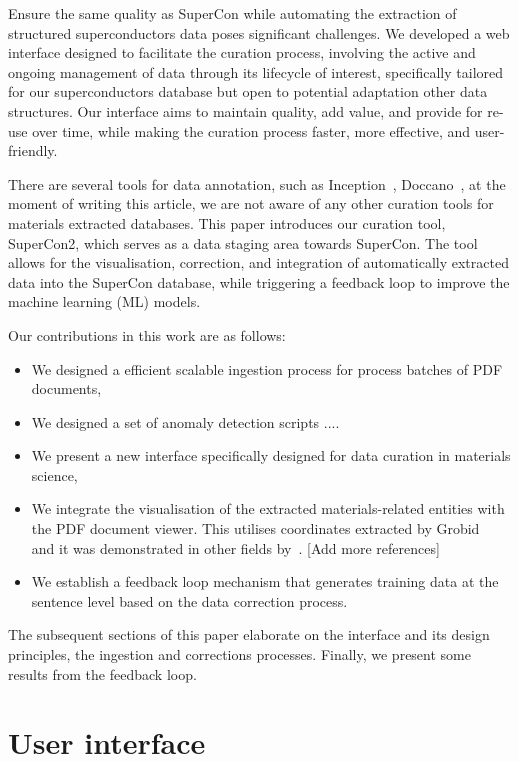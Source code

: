 \documentclass{article}
\begin{document}
Ensure the same quality as SuperCon while automating the extraction of structured superconductors data poses significant challenges. 
We developed a web interface designed to facilitate the curation process, involving the active and ongoing management of data through its lifecycle of interest, specifically tailored for our superconductors database but open to potential adaptation other data structures. 
Our interface aims to maintain quality, add value, and provide for re-use over time, while making the curation process faster, more effective, and user-friendly.

There are several tools for data annotation, such as Inception~\cite{klie-etal-2018-inception}, Doccano~\cite{doccano}, at the moment of writing this article, we are not aware of any other curation tools for materials extracted databases. 
This paper introduces our curation tool, SuperCon2, which serves as a data staging area towards SuperCon. The tool allows for the visualisation, correction, and integration of automatically extracted data into the SuperCon database, while triggering a feedback loop to improve the machine learning (ML) models.

Our contributions in this work are as follows:
\begin{itemize}
    \item We designed a efficient scalable ingestion process for process batches of PDF documents,
    \item We designed a set of anomaly detection scripts ....
    \item We present a new interface specifically designed for data curation in materials science, 
    \item We integrate the visualisation of the extracted materials-related entities with the PDF document viewer. This utilises coordinates extracted by Grobid~\cite{GROBID} and it was demonstrated in other fields by~\cite{wang2022hammer}. [Add more references] 
    \item We establish a feedback loop mechanism that generates training data at the sentence level based on the data correction process.
\end{itemize}

The subsequent sections of this paper elaborate on the interface and its design principles, the ingestion and corrections processes. Finally, we present some results from the feedback loop. 

\section{User interface}
\end{document}
